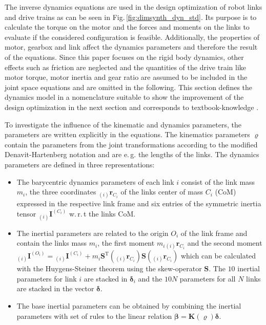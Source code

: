 \documentclass{svproc}
\newcommand{\bm}[1]{\boldsymbol{#1}}
\newcommand{\ortvek}[4]{{ }_{(#1)}{\boldsymbol{#2}}^{#3}_{#4} }
\newcommand{\transp}[0]{{\mathrm{T}}}
\begin{document}
The inverse dynamics equations are used in the design optimization of robot links and drive trains as can be seen in Fig.\,\ref{fig:dimsynth_dyn_std}.
Its purpose is to calculate the torque on the motor and the forces and moments on the links to evaluate if the considered configuration is feasible.
Additionally, the properties of motor, gearbox and link affect the dynamics parameters and therefore the result of the equations.
Since this paper focuses on the rigid body dynamics, other effects such as friction are neglected and the quantities of the drive train like motor torque, motor inertia and gear ratio are assumed to be included in the joint space equations and are omitted in the following.
This section defines the dynamics model in a nomenclature suitable to show the improvement of the design optimization in the next section and corresponds to textbook-knowledge \cite{KhalilDom2002}.

To investigate the influence of the kinematic and dynamics parameters, the parameters are written explicitly in the equations.
The kinematics parameters $\bm{\varrho}$ contain the parameters from the joint transformations according to the modified Denavit-Hartenberg notation and are e.\,g. the lengths of the links.
%
The dynamics parameters are defined in three representations:
\begin{itemize}
\item The barycentric dynamics parameters of each link $i$ consist of the link mass $m_i$, the three coordinates $\ortvek{i}{r}{}{C_i}$ of the links center of mass $C_i$ (CoM)  expressed in the respective link frame and six entries of the symmetric inertia tensor $\ortvek{i}{I}{(C_i)}{}$ w.\,r.\,t the links CoM. 
\item The inertial parameters are related to the origin $O_i$ of the link frame and contain the links mass $m_i$, the first moment $m_i \ortvek{i}{r}{}{C_i}$ and the second moment $\ortvek{i}{I}{(O_i)}{}=\ortvek{i}{I}{(C_i)}{}+m_i\bm{S}^\transp(\ortvek{i}{r}{}{C_i})\bm{S}(\ortvek{i}{r}{}{C_i})$ which can be calculated with the Huygens-Steiner theorem using the skew-operator $\bm{S}$.
The $10$ inertial parameters for link $i$ are stacked in $\bm{\delta}_i$ and the $10N$ parameters for all $N$ links are stacked in the vector $\bm{\delta}$.
\item The base inertial parameters can be obtained by combining the inertial parameters with set of rules to the linear relation $\bm{\beta}=\bm{K}(\bm{\varrho})\bm{\delta}$.
\end{itemize}
%
\end{document}

